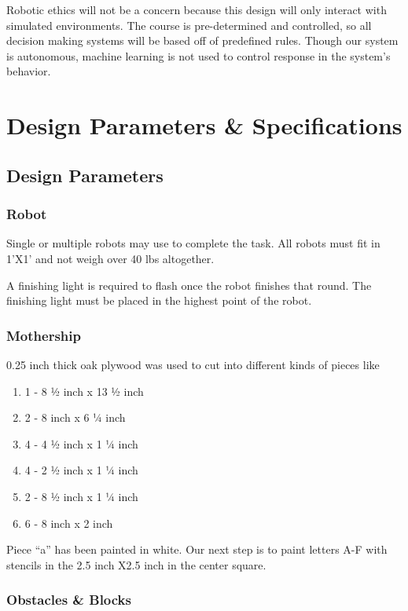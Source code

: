 \documentclass[12pt]{article}
\begin{document}
Robotic ethics will not be a concern because this design will only interact with simulated environments. The course is pre-determined and controlled, so all decision making systems will be based off of predefined rules. Though our system is autonomous, machine learning is not used to control response in the system’s behavior.

\section{Design Parameters \& Specifications}
\subsection{Design Parameters}

\subsubsection{Robot}

Single or multiple robots may use to complete the task. All robots must fit in 1’X1’ and not weigh over 40 lbs altogether.

A finishing light is required to flash once the robot finishes that round. The finishing light must be placed in the highest point of the robot.

\subsubsection{Mothership}

0.25 inch thick oak plywood was used to cut into different kinds of pieces like 

\begin{enumerate}[noitemsep]
	\item 1 - 8 ½ inch x 13 ½ inch 
	\item 2 - 8 inch x 6 ¼ inch 
	\item 4 - 4 ½ inch x 1 ¼ inch 
	\item 4 - 2 ½ inch x 1 ¼ inch 
	\item 2 - 8 ½ inch x 1 ¼ inch 
	\item 6 - 8 inch x 2 inch
\end{enumerate}

Piece “a” has been painted in white. Our next step is to paint letters A-F with stencils in the 2.5 inch X2.5 inch in the center square.

\subsubsection{Obstacles \& Blocks}
\end{document}
